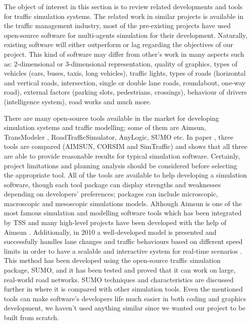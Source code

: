 \documentclass[oneside]{article}
\begin{document}
The object of interest in this section is to review related developments and tools for traffic simulation systems. The related work in similar projects is available in the traffic management industry, most of the pre-existing projects have used open-source software for multi-agents simulation for their development. Naturally, existing software will either outperform or lag regarding the objectives of our project. This kind of software may differ from other's work in many aspects such as: 2-dimensional or 3-dimensional representation, quality of graphics, types of vehicles (cars, buses, taxis, long vehicles), traffic lights, types of roads (horizontal and vertical roads, intersection, single or double lane roads, roundabout, one-way road), external factors (parking slots, pedestrians, crossings), behaviour of drivers (intelligence system), road works and much more. 
\newline

\noindent There are many open-source tools available in the market for developing simulation systems and traffic modelling; some of them are Aimsun, TransModeler \cite{TransModeler}, RoadTrafficSimulator, AnyLogic, SUMO etc. In paper \cite{jones2004traffic}, three tools are compared (AIMSUN, CORSIM and SimTraffic) and shows that all three are able to provide reasonable results for typical simulation software. Certainly, project limitations and planning analysis should be considered before selecting the appropriate tool. All of the tools are available to help developing a simulation software, though each tool package can display strengths and weaknesses depending on developers' preferences; packages can include microscopic, macroscopic and mesoscopic simulations models. Although Aimsun is one of the most famous simulation and modelling software tools which has been integrated by TSS and many high-level projects have been developed with the help of Aimsun \cite{auss}. Additionally, in 2010 a well-developed model is presented and successfully handles lane changes and traffic behaviours based on different speed limits in order to have a scalable and interactive system for real-time scenarios \cite{sewall2010continuum}. This method has been developed using the open-source traffic simulation package, SUMO, and it has been tested and proved that it can work on large, real-world road networks. SUMO techniques and characteristics are discussed further in \cite{kotusevski2009review} where it is compared with other simulation tools. Even the mentioned tools can make software's developers life much easier in both coding and graphics development, we haven't used anything similar since we wanted our project to be built from scratch.
\newline
\end{document}
